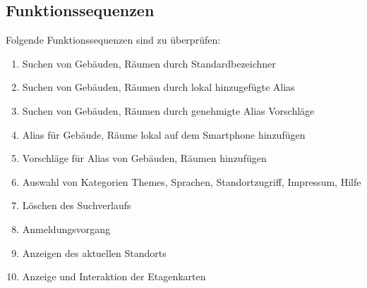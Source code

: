 \subsection{Funktionssequenzen}

Folgende Funktionssequenzen sind zu überprüfen:
\begin{enumerate}[label=\textbf{/T\arabic*0/}, align=left]
	\item Suchen von Gebäuden, Räumen durch Standardbezeichner
	\item Suchen von Gebäuden, Räumen durch lokal hinzugefügte Alias
	\item Suchen von Gebäuden, Räumen durch genehmigte Alias Vorschläge
	\item Alias für Gebäude, Räume lokal auf dem Smartphone hinzufügen
	\item Vorschläge für Alias von Gebäuden, Räumen hinzufügen
	\item Auswahl von Kategorien Themes, Sprachen, Standortzugriff, Impressum, Hilfe
	\item Löschen des Suchverlaufs
	\item Anmeldungsvorgang
	\item Anzeigen des aktuellen Standorts
	\item Anzeige und Interaktion der Etagenkarten

\end{enumerate}
